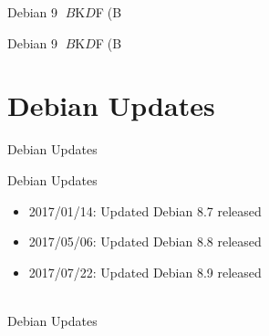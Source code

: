{{\begin{frame}
\begin{center}
{\begin{frame}{Debian 9 $B$K$D$$$F(B}
\end{frame}


\begin{frame}{Debian 9 $B$K$D$$$F(B}%
\end{frame}


\section{Debian Updates}
\begin{frame}\begin{center}\Huge{Debian Updates}\end{center}\end{frame}


\begin{frame}{Debian Updates}%

\begin{itemize}[<+->]
\item 2017/01/14:  Updated Debian 8.7 released\\
\item 2017/05/06:  Updated Debian 8.8 released\\
\item 2017/07/22:  Updated Debian 8.9 released\\
\ \\
   \small{}

\end{itemize}

\end{frame}


\begin{frame}{Debian Updates}%

\begin{itemize}[<+->]
\item 2017/4/15:  Debian Project Leader Elections 2017 $BEjI<Dy$a@Z$j(B\\
\ \\
   \small{2017$BG/$N(BDebian$B%

}
\end{itemize}
\end{frame}}
\end{center}
\end{frame}}}
